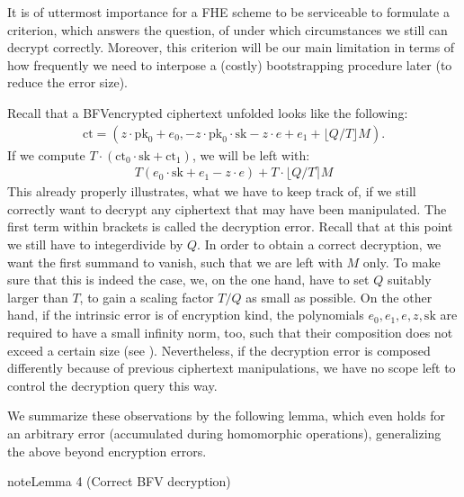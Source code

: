 \documentclass[letterpaper,10pt,english]{jupyterBook}
\begin{document}
\sphinxAtStartPar
It is of uttermost importance for a FHE scheme to be serviceable to formulate a criterion, which answers the question, of under which circumstances we still can decrypt correctly.
Moreover, this criterion will be our main limitation in terms of how frequently we need to interpose a (costly) bootstrapping procedure later (to reduce the error size).

\sphinxAtStartPar
Recall that a BFV\sphinxhyphen{}encrypted ciphertext unfolded looks like the following:
\begin{equation*}
\begin{split}\mathrm{ct} = (z\cdot \mathrm{pk}_0 +e_0, -z \cdot \mathrm{pk}_0 \cdot \mathrm{sk} - z\cdot e +e_1 + \lfloor Q/T \rfloor M).\end{split}
\end{equation*}
\sphinxAtStartPar
If we compute \(T \cdot (\mathrm{ct}_0 \cdot \mathrm{sk} + \mathrm{ct}_1)\), we will be left with:
\begin{equation*}
\begin{split}T (e_0\cdot \mathrm{sk}+e_1-z\cdot e) + T\cdot \lfloor Q/T \rceil M\end{split}
\end{equation*}
\sphinxAtStartPar
This already properly illustrates, what we have to keep track of, if we still correctly want to decrypt any ciphertext that may have been manipulated.
The first term within brackets is called the decryption error.
Recall that at this point we still have to integer\sphinxhyphen{}divide by \(Q\).
In order to obtain a correct decryption, we want the first summand to vanish, such that we are left with \(M\) only.
To make sure that this is indeed the case, we, on the one hand, have to set \(Q\) suitably larger than \(T\), to gain a scaling factor \(T/Q\) as small as possible.
On the other hand, if the intrinsic error is of encryption kind, the polynomials \(e_0, e_1, e, z, \mathrm{sk}\) are required to have a small infinity norm, too, such that their composition does not exceed a certain size (see {\hyperref[\detokenize{Thesis:error-after-BFV-encryption}]{}}).
Nevertheless, if the decryption error is composed differently because of previous ciphertext manipulations, we have no scope left to control the decryption query this way.

\sphinxAtStartPar
We summarize these observations by the following lemma, which even holds for an arbitrary error (accumulated during homomorphic operations), generalizing the above beyond encryption errors.
\label{Thesis:correct-BFV-decryption}
\begin{sphinxadmonition}{note}{Lemma 4 (Correct BFV decryption)}
\end{sphinxadmonition}
\end{document}

